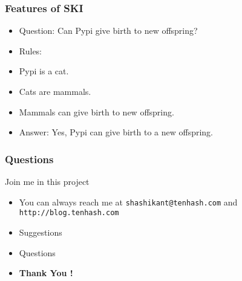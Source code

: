 \documentclass{beamer}
\begin{document}
\begin{frame}
 \frametitle{Features of SKI}
 \begin{example}
  \begin{itemize}

  \item  \alert{Question:} Can Pypi give birth to new offspring?
   \pause
   \item \alert{Rules:}
   \item Pypi is a cat.
   \item Cats are mammals.
   \item Mammals can give birth to new offspring.
   \pause
   \item \alert{Answer:} Yes, Pypi can give birth to a new offspring.
  \end{itemize}
 \end{example}
\end{frame}


\begin{frame}
 \frametitle{Questions}
 \begin{block}{Join me in this project}
  \begin{itemize}
  \pause
  \item You can always reach me at \texttt{shashikant@tenhash.com} and \texttt{http://blog.tenhash.com}
  \pause
   \item Suggestions
    \pause
   \item Questions
   \pause
   \item \textbf{Thank You !}
  \end{itemize}

 \end{block}

\end{frame}
\end{document}
